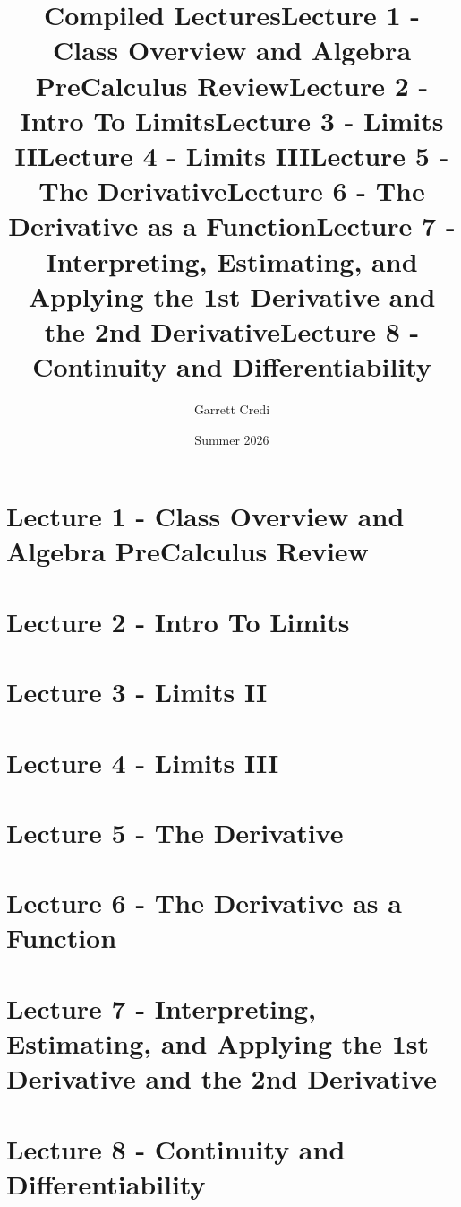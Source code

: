 \documentclass[handout]{ltx-talk}
\title{Compiled Lectures}
\author{Garrett Credi}
\date{Summer 2026}
\begin{document}
\section{Lecture 1 - Class Overview and Algebra PreCalculus Review}
\title{Lecture 1 - Class Overview and Algebra PreCalculus Review}

\section{Lecture 2 - Intro To Limits}
\title{Lecture 2 - Intro To Limits}

\section{Lecture 3 - Limits II}
\title{Lecture 3 - Limits II}

\section{Lecture 4 - Limits III}
\title{Lecture 4 - Limits III}

\section{Lecture 5 - The Derivative}
\title{Lecture 5 - The Derivative}

\section{Lecture 6 - The Derivative as a Function}
\title{Lecture 6 - The Derivative as a Function}

\section{Lecture 7 - Interpreting, Estimating, and Applying the 1st Derivative and the 2nd Derivative}
\title{Lecture 7 - Interpreting, Estimating, and Applying the 1st Derivative and the 2nd Derivative}

\section{Lecture 8 - Continuity and Differentiability}
\title{Lecture 8 - Continuity and Differentiability}

\end{document}
